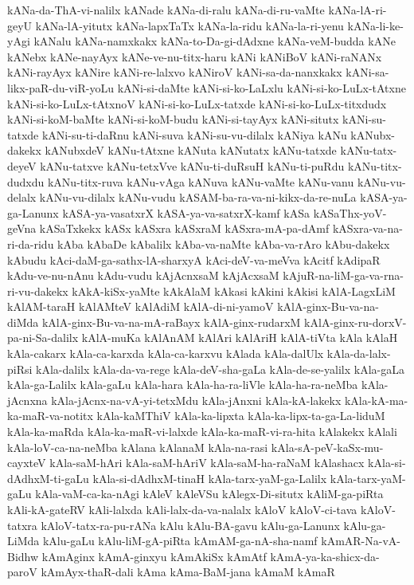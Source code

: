 {kANa-da-ThA-vi-nalilx
kANade
kANa-di-ralu
kANa-di-ru-vaMte
kANa-lA-ri-geyU
kANa-lA-yitutx
kANa-lapxTaTx
kANa-la-ridu
kANa-la-ri-yenu
kANa-li-ke-yAgi
kANalu
kANa-namxkakx
kANa-to-Da-gi-dAdxne
kANa-veM-budda
kANe
kANebx
kANe-nayAyx
kANe-ve-nu-titx-haru
kANi
kANiBoV
kANi-raNANx
kANi-rayAyx
kANire
kANi-re-lalxvo
kANiroV
kANi-sa-da-nanxkakx
kANi-sa-likx-paR-du-viR-yoLu
kANi-si-daMte
kANi-si-ko-LaLxlu
kANi-si-ko-LuLx-tAtxne
kANi-si-ko-LuLx-tAtxnoV
kANi-si-ko-LuLx-tatxde
kANi-si-ko-LuLx-titxdudx
kANi-si-koM-baMte
kANi-si-koM-budu
kANi-si-tayAyx
kANi-situtx
kANi-su-tatxde
kANi-su-ti-daRnu
kANi-suva
kANi-su-vu-dilalx
kANiya
kANu
kANubx-dakekx
kANubxdeV
kANu-tAtxne
kANuta
kANutatx
kANu-tatxde
kANu-tatx-deyeV
kANu-tatxve
kANu-tetxVve
kANu-ti-duRsuH
kANu-ti-puRdu
kANu-titx-dudxdu
kANu-titx-ruva
kANu-vAga
kANuva
kANu-vaMte
kANu-vanu
kANu-vu-delalx
kANu-vu-dilalx
kANu-vudu
kASAM-ba-ra-va-ni-kikx-da-re-nuLa
kASA-ya-ga-Lanunx
kASA-ya-vasatxrX
kASA-ya-va-satxrX-kamf
kASa
kASaThx-yoV-geVna
kASaTxkekx
kASx
kASxra
kASxraM
kASxra-mA-pa-dAmf
kASxra-va-na-ri-da-ridu
kAba
kAbaDe
kAbalilx
kAba-va-naMte
kAba-va-rAro
kAbu-dakekx
kAbudu
kAci-daM-ga-sathx-lA-sharxyA
kAci-deV-va-meVva
kAcitf
kAdipaR
kAdu-ve-nu-nAnu
kAdu-vudu
kAjAcnxsaM
kAjAcxsaM
kAjuR-na-liM-ga-va-rna-ri-vu-dakekx
kAkA-kiSx-yaMte
kAkAlaM
kAkasi
kAkini
kAkisi
kAlA-LagxLiM
kAlAM-taraH
kAlAMteV
kAlAdiM
kAlA-di-ni-yamoV
kAlA-ginx-Bu-va-na-diMda
kAlA-ginx-Bu-va-na-mA-raBayx
kAlA-ginx-rudarxM
kAlA-ginx-ru-dorxV-pa-ni-Sa-dalilx
kAlA-muKa
kAlAnAM
kAlAri
kAlAriH
kAlA-tiVta
kAla
kAlaH
kAla-cakarx
kAla-ca-karxda
kAla-ca-karxvu
kAlada
kAla-dalUlx
kAla-da-lalx-piRsi
kAla-dalilx
kAla-da-va-rege
kAla-deV-sha-gaLa
kAla-de-se-yalilx
kAla-gaLa
kAla-ga-Lalilx
kAla-gaLu
kAla-hara
kAla-ha-ra-liVle
kAla-ha-ra-neMba
kAla-jAcnxna
kAla-jAcnx-na-vA-yi-tetxMdu
kAla-jAnxni
kAla-kA-lakekx
kAla-kA-ma-ka-maR-va-notitx
kAla-kaMThiV
kAla-ka-lipxta
kAla-ka-lipx-ta-ga-La-liduM
kAla-ka-maRda
kAla-ka-maR-vi-lalxde
kAla-ka-maR-vi-ra-hita
kAlakekx
kAlali
kAla-loV-ca-na-neMba
kAlana
kAlanaM
kAla-na-rasi
kAla-sA-peV-kaSx-mu-cayxteV
kAla-saM-hAri
kAla-saM-hAriV
kAla-saM-ha-raNaM
kAlashacx
kAla-si-dAdhxM-ti-gaLu
kAla-si-dAdhxM-tinaH
kAla-tarx-yaM-ga-Lalilx
kAla-tarx-yaM-gaLu
kAla-vaM-ca-ka-nAgi
kAleV
kAleVSu
kAlegx-Di-situtx
kAliM-ga-piRta
kAli-kA-gateRV
kAli-lalxda
kAli-lalx-da-va-nalalx
kAloV
kAloV-ci-tava
kAloV-tatxra
kAloV-tatx-ra-pu-rANa
kAlu
kAlu-BA-gavu
kAlu-ga-Lanunx
kAlu-ga-LiMda
kAlu-gaLu
kAlu-liM-gA-piRta
kAmAM-ga-nA-sha-namf
kAmAR-Na-vA-Bidhw
kAmAginx
kAmA-ginxyu
kAmAkiSx
kAmAtf
kAmA-ya-ka-shicx-da-paroV
kAmAyx-thaR-dali
kAma
kAma-BaM-jana
kAmaM
kAmaR
}
